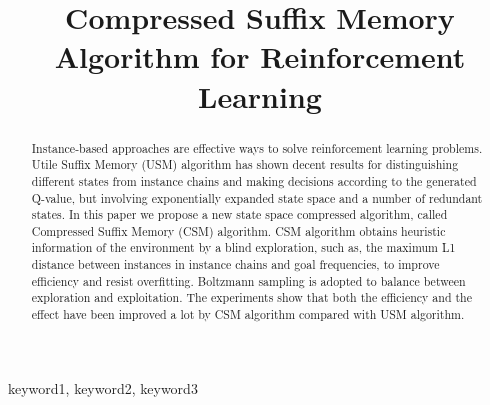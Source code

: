 \documentclass[conference]{IEEEtran}
\begin{document}
	
	\title{Compressed Suffix Memory Algorithm for Reinforcement Learning\\
	}
	\author{
		\and
		\and
	}
	
	\maketitle
	
	\begin{abstract}
		Instance-based approaches are effective ways to solve reinforcement learning problems.
		Utile Suffix Memory (USM) algorithm has shown decent results for distinguishing different
		states from instance chains and making decisions according to the generated Q-value, but involving
		exponentially expanded state space and a number of redundant states. In this paper we
		propose a new state space compressed algorithm, called Compressed Suffix Memory (CSM)
		algorithm. CSM algorithm obtains heuristic information of the environment by a blind
		exploration, such as, the maximum L1 distance between instances in instance chains
		and goal frequencies, to improve efficiency and resist overfitting. Boltzmann sampling
		is adopted to balance between exploration and exploitation. The experiments show that both
		the efficiency and the effect have been improved a lot by CSM algorithm compared with
		USM algorithm.
	\end{abstract}
	
	\begin{IEEEkeywords}
		keyword1, keyword2, keyword3
	\end{IEEEkeywords}
	
\end{document}
